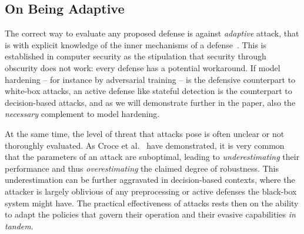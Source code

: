 
\subsection{On Being Adaptive}

The correct way to evaluate any proposed defense is against \emph{adaptive} attack, that is with explicit knowledge of the inner mechanisms of a defense~\cite{tramer2020adaptive}.
This is established in computer security as the stipulation that security through obscurity does not work: every defense has a potential workaround.
If model hardening -- for instance by adversarial training -- is the defensive counterpart to white-box attacks, an active defense like stateful detection is the counterpart to decision-based attacks, and as we will demonstrate further in the paper, also the \emph{necessary} complement to model hardening.

At the same time, the level of threat that attacks pose is often unclear or not thoroughly evaluated.
As Croce et al.~\cite{croce2020reliable} have demonstrated, it is very common that the parameters of an attack are suboptimal, leading to \textit{underestimating} their performance and thus \textit{overestimating} the claimed degree of robustness.
This underestimation can be further aggravated in decision-based contexts, where the attacker is largely oblivious of any preprocessing or active defenses the black-box system might have.
The practical effectiveness of attacks rests then on the ability to adapt the policies that govern their operation and their evasive capabilities \textit{in tandem}.

